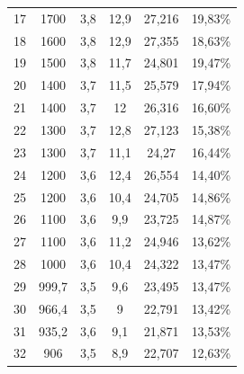 \begin{longtable}{cccccc}
  17          & 1700                 & 3,8           & 12,9           & 27,216        & 19,83\%                         \\
  18          & 1600                 & 3,8           & 12,9           & 27,355        & 18,63\%                         \\
  19          & 1500                 & 3,8           & 11,7           & 24,801        & 19,47\%                         \\
  20          & 1400                 & 3,7           & 11,5           & 25,579        & 17,94\%                         \\
  21          & 1400                 & 3,7           & 12             & 26,316        & 16,60\%                         \\
  22          & 1300                 & 3,7           & 12,8           & 27,123        & 15,38\%                         \\
  23          & 1300                 & 3,7           & 11,1           & 24,27         & 16,44\%                         \\
  24          & 1200                 & 3,6           & 12,4           & 26,554        & 14,40\%                         \\
  25          & 1200                 & 3,6           & 10,4           & 24,705        & 14,86\%                         \\
  26          & 1100                 & 3,6           & 9,9            & 23,725        & 14,87\%                         \\
  27          & 1100                 & 3,6           & 11,2           & 24,946        & 13,62\%                         \\
  28          & 1000                 & 3,6           & 10,4           & 24,322        & 13,47\%                         \\
  29          & 999,7                & 3,5           & 9,6            & 23,495        & 13,47\%                         \\
  30          & 966,4                & 3,5           & 9              & 22,791        & 13,42\%                         \\
  31          & 935,2                & 3,6           & 9,1            & 21,871        & 13,53\%                         \\
  32          & 906                  & 3,5           & 8,9            & 22,707        & 12,63\%                         \\

\end{longtable}
